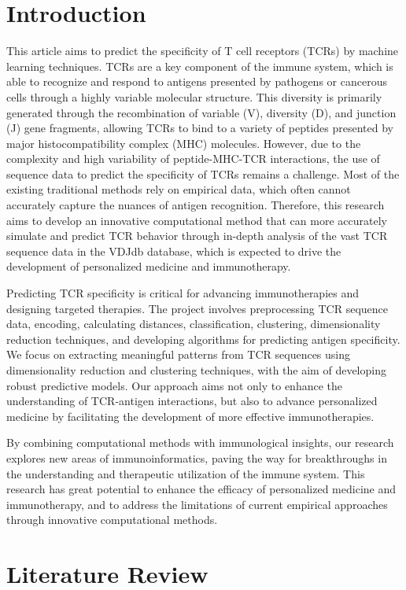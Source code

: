\documentclass[conference]{IEEEtran}
\begin{document}
	\section{Introduction}
	This article aims to predict the specificity of T cell receptors (TCRs) by machine learning techniques. TCRs are a key component of the immune system, which is able to recognize and respond to antigens presented by pathogens or cancerous cells through a highly variable molecular structure. This diversity is primarily generated through the recombination of variable (V), diversity (D), and junction (J) gene fragments, allowing TCRs to bind to a variety of peptides presented by major histocompatibility complex (MHC) molecules. However, due to the complexity and high variability of peptide-MHC-TCR interactions, the use of sequence data to predict the specificity of TCRs remains a challenge. Most of the existing traditional methods rely on empirical data, which often cannot accurately capture the nuances of antigen recognition. Therefore, this research aims to develop an innovative computational method that can more accurately simulate and predict TCR behavior through in-depth analysis of the vast TCR sequence data in the VDJdb database, which is expected to drive the development of personalized medicine and immunotherapy.
	
	Predicting TCR specificity is critical for advancing immunotherapies and designing targeted therapies. The project involves preprocessing TCR sequence data, encoding, calculating distances, classification, clustering, dimensionality reduction techniques, and developing algorithms for predicting antigen specificity. We focus on extracting meaningful patterns from TCR sequences using dimensionality reduction and clustering techniques, with the aim of developing robust predictive models. Our approach aims not only to enhance the understanding of TCR-antigen interactions, but also to advance personalized medicine by facilitating the development of more effective immunotherapies.
	
	By combining computational methods with immunological insights, our research explores new areas of immunoinformatics, paving the way for breakthroughs in the understanding and therapeutic utilization of the immune system. This research has great potential to enhance the efficacy of personalized medicine and immunotherapy, and to address the limitations of current empirical approaches through innovative computational methods.
	
	\section{Literature Review}
	
\end{document}
